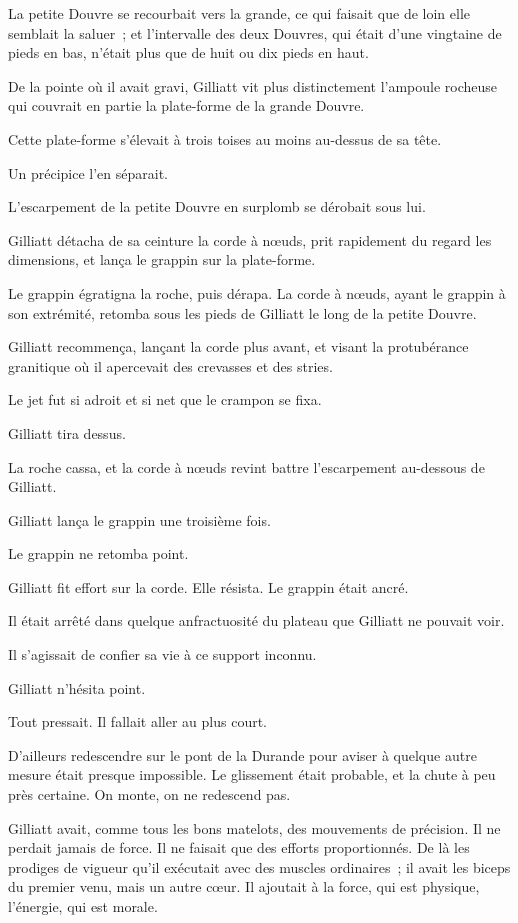 \documentclass[french,twoside]{book} %
\begin{document}
La petite Douvre se recourbait vers la grande, ce qui faisait que de loin elle semblait la saluer ; et l’intervalle des deux Douvres, qui était d’une vingtaine de pieds en bas, n’était plus que de huit ou dix pieds en haut.\par
De la pointe où il avait gravi, Gilliatt vit plus distinctement l’ampoule rocheuse qui couvrait en partie la plate-forme de la grande Douvre.\par
Cette plate-forme s’élevait à trois toises au moins au-dessus de sa tête.\par
Un précipice l’en séparait.\par
L’escarpement de la petite Douvre en surplomb se dérobait sous lui.\par
Gilliatt détacha de sa ceinture la corde à nœuds, prit rapidement du regard les dimensions, et lança le grappin sur la plate-forme.\par
Le grappin égratigna la roche, puis dérapa. La corde à nœuds, ayant le grappin à son extrémité, retomba sous les pieds de Gilliatt le long de la petite Douvre.\par
 Gilliatt recommença, lançant la corde plus avant, et visant la protubérance granitique où il apercevait des crevasses et des stries.\par
Le jet fut si adroit et si net que le crampon se fixa.\par
Gilliatt tira dessus.\par
La roche cassa, et la corde à nœuds revint battre l’escarpement au-dessous de Gilliatt.\par
Gilliatt lança le grappin une troisième fois.\par
Le grappin ne retomba point.\par
Gilliatt fit effort sur la corde. Elle résista. Le grappin était ancré.\par
Il était arrêté dans quelque anfractuosité du plateau que Gilliatt ne pouvait voir.\par
Il s’agissait de confier sa vie à ce support inconnu.\par
Gilliatt n’hésita point.\par
Tout pressait. Il fallait aller au plus court.\par
D’ailleurs redescendre sur le pont de la Durande pour aviser à quelque autre mesure était presque impossible. Le glissement était probable, et la chute à peu près certaine. On monte, on ne redescend pas.\par
Gilliatt avait, comme tous les bons matelots, des mouvements de précision. Il ne perdait jamais de force. Il ne faisait que des efforts proportionnés. De là les prodiges de vigueur qu’il exécutait avec des muscles ordinaires ; il avait les biceps du premier venu, mais un autre cœur. Il ajoutait à la force, qui est physique, l’énergie, qui est morale.\par
\end{document}
